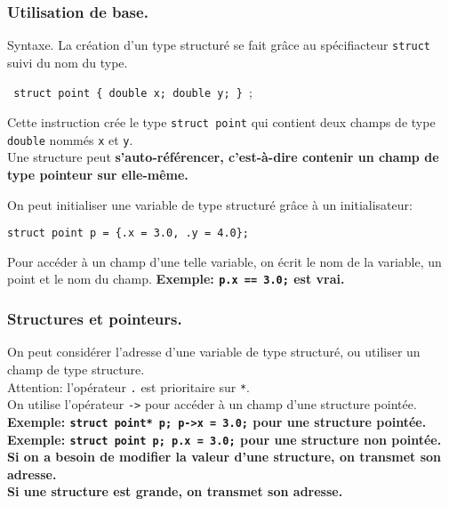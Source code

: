\documentclass[french, 11pt]{article}
\begin{document}
\pagebreak

\subsubsection{Utilisation de base.}

\begin{defi}{Syntaxe.}{}
    La création d'un type structuré se fait grâce au spécifiacteur \texttt{struct} suivi du nom du type.
    \begin{center}
        \texttt{
            struct point \{
                double x;
                double y;
            \}
        };
    \end{center}
    Cette instruction crée le type \texttt{struct point} qui contient deux champs de type \texttt{double} nommés \texttt{x} et \texttt{y}.\\
    Une structure peut \bf{s'auto-référencer}, c'est-à-dire contenir un champ de type pointeur sur elle-même.
\end{defi}

\begin{defi}{}{}
    On peut initialiser une variable de type structuré grâce à un initialisateur:
    \begin{center}
        \texttt{struct point p = \{.x = 3.0, .y = 4.0\};}
    \end{center}
    Pour accéder à un champ d'une telle variable, on écrit le nom de la variable, un point et le nom du champ.\n
    \bf{Exemple:} \texttt{p.x == 3.0;} est vrai.
\end{defi}

\subsubsection{Structures et pointeurs.}

\begin{defi}{}{}
    On peut considérer l'adresse d'une variable de type structuré, ou utiliser un champ de type structure.\\
    Attention: l'opérateur \texttt{.} est prioritaire sur \texttt{*}.\\
    On utilise l'opérateur \texttt{->} pour accéder à un champ d'une structure pointée.\n
    \bf{Exemple:} \texttt{struct point* p; p->x = 3.0;} pour une structure pointée.\\
    \bf{Exemple:} \texttt{struct point p; p.x = 3.0;} pour une structure non pointée.\n
    Si on a besoin de modifier la valeur d'une structure, on transmet son adresse.\\
    Si une structure est grande, on transmet son adresse.
\end{defi}
\end{document}
